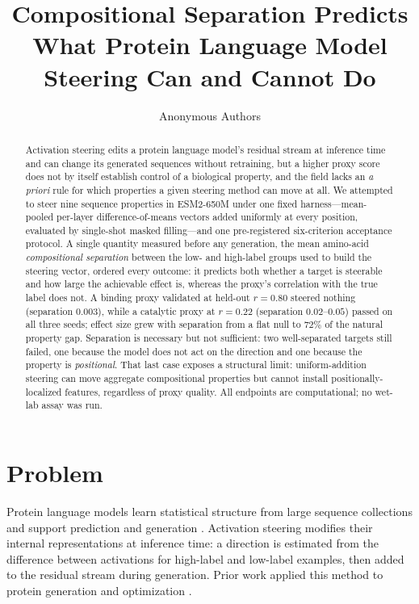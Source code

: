 \documentclass{article}
\title{Compositional Separation Predicts What Protein Language Model
Steering Can and Cannot Do}
\author{Anonymous Authors}
\begin{document}
\maketitle

\begin{abstract}
Activation steering edits a protein language model's residual stream at
inference time and can change its generated sequences without retraining, but a
higher proxy score does not by itself establish control of a biological
property, and the field lacks an \emph{a priori} rule for which properties a
given steering method can move at all. We attempted to steer nine sequence
properties in ESM2-650M under one fixed harness---mean-pooled per-layer
difference-of-means vectors added uniformly at every position, evaluated by
single-shot masked filling---and one pre-registered six-criterion acceptance
protocol. A single quantity measured before any generation, the mean amino-acid
\emph{compositional separation} between the low- and high-label groups used to
build the steering vector, ordered every outcome: it predicts both whether a
target is steerable and how large the achievable effect is, whereas the
proxy's correlation with the true label does not. A binding proxy validated at
held-out $r=0.80$ steered nothing (separation $0.003$), while a catalytic proxy
at $r=0.22$ (separation $0.02$--$0.05$) passed on all three seeds; effect size
grew with separation from a flat null to $72\%$ of the natural property gap.
Separation is necessary but not sufficient: two well-separated targets still
failed, one because the model does not act on the direction and one because the
property is \emph{positional}. That last case exposes a structural limit:
uniform-addition steering can move aggregate compositional properties but
cannot install positionally-localized features, regardless of proxy quality.
All endpoints are computational; no wet-lab assay was run.
\end{abstract}

\section{Problem}
\label{sec:problem}

Protein language models learn statistical structure from large sequence
collections and support prediction and generation \citep{lin2023esm}.
Activation steering modifies their internal representations at inference time:
a direction is estimated from the difference between activations for high-label
and low-label examples, then added to the residual stream during generation.
Prior work applied this method to protein generation and optimization
\citep{huang2025steering}.
\end{document}
